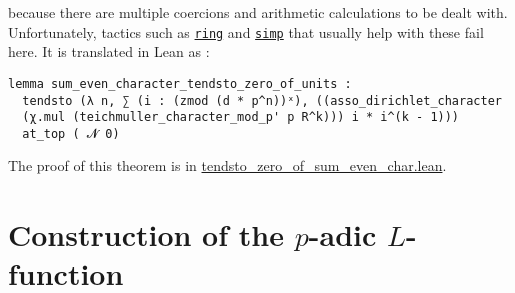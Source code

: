 \documentclass[a4paper,UKenglish,cleveref, autoref, thm-restate]{lipics-v2021}
\newcommand{\lean}[1]{\texttt{#1}\xspace} %
\begin{document}
because there are multiple coercions and arithmetic calculations to be dealt with. %
Unfortunately, tactics such as \href{https://leanprover-community.github.io/mathlib_docs/tactics.html#ring}{\lean{ring}} and 
\href{https://leanprover-community.github.io/mathlib_docs/tactics.html#simp}{\lean{simp}} that usually help with these fail here. 
It is translated in Lean as :
\begin{lstlisting}
lemma sum_even_character_tendsto_zero_of_units :
  tendsto (λ n, ∑ (i : (zmod (d * p^n))ˣ), ((asso_dirichlet_character
  (χ.mul (teichmuller_character_mod_p' p R^k))) i * i^(k - 1))) 
  at_top ( 𝓝 0) 
\end{lstlisting}
The proof of this theorem is in \href{https://github.com/laughinggas/p-adic-L-functions/blob/main/src/tendsto_zero_of_sum_even_char.lean}{tendsto\_zero\_of\_sum\_even\_char.lean}.
\section{Construction of the $p$-adic $L$-function}
\label{section3}
\end{document}

